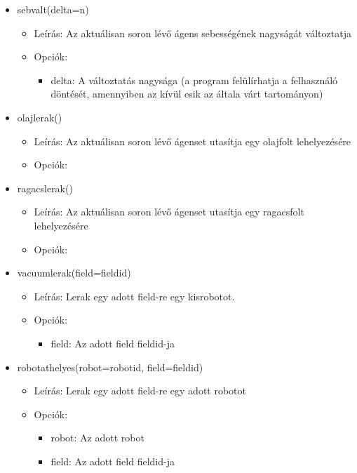 \begin{itemize}
    \item sebvalt(delta=n)
    \begin{itemize}
        \item Leírás: Az aktuálisan soron lévő ágens sebességének nagyságát változtatja
        \item Opciók: 
            \begin{itemize}
                \item delta: A változtatás nagysága (a program felülírhatja a felhasználó döntését, amennyiben az kívül esik az általa várt tartományon) 
            \end{itemize}
    \end{itemize}

    \item olajlerak()
    \begin{itemize}
        \item Leírás: Az aktuálisan soron lévő ágenset utasítja egy olajfolt lehelyezésére
        \item Opciók: 
    \end{itemize}

    \item ragacslerak()
    \begin{itemize}
        \item Leírás: Az aktuálisan soron lévő ágenset utasítja egy ragacsfolt lehelyezésére
        \item Opciók: 
    \end{itemize}
    
    \item vacuumlerak(field=fieldid)
    \begin{itemize}
    	\item Leírás: Lerak egy adott field-re egy kisrobotot.
       	\item Opciók: 
            \begin{itemize}
                  	\item field: Az adott field fieldid-ja
            \end{itemize}	
    \end{itemize}
    
    \item robotathelyes(robot=robotid, field=fieldid)
    \begin{itemize}
    	\item Leírás: Lerak egy adott field-re egy adott robotot
    	\item Opciók: 
    	\begin{itemize}
    		\item robot: Az adott robot
    		\item field: Az adott field fieldid-ja
    	\end{itemize}	
    \end{itemize}      
    

\end{itemize}
